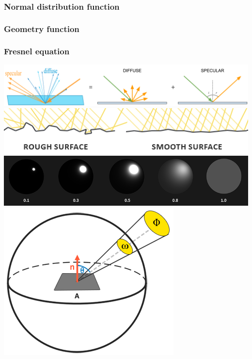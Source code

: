 \documentclass[
  11pt,
  a4paper,
  oneside
  ]{article}
\begin{document}
\subsubsection{Normal distribution function}
\subsubsection{Geometry function}
\subsubsection{Fresnel equation}
\includegraphics*[width=0.9 \textwidth]{images/brdf.PNG}\\
\includegraphics*[width=0.9 \textwidth]{images/microfacets_light_rays.png}\\
\includegraphics*[width=0.9 \textwidth]{images/ndf.png}\\
\includegraphics*[width=0.9 \textwidth]{images/radiance.png}\\
\end{document}
